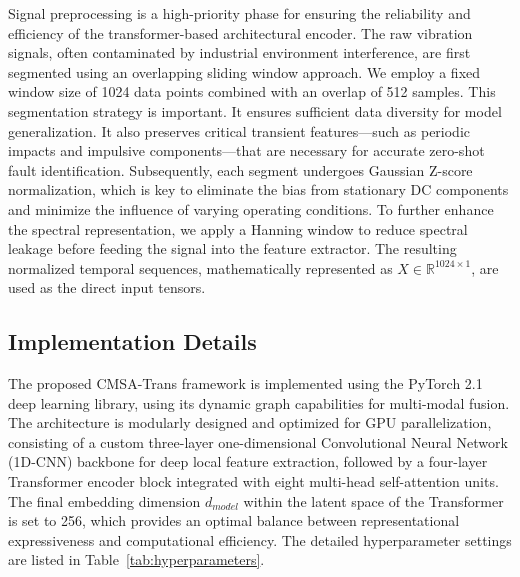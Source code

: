 \documentclass[journal]{IEEEtran}
\begin{document}
Signal preprocessing is a high-priority phase for ensuring the reliability and efficiency of the transformer-based architectural encoder. The raw vibration signals, often contaminated by industrial environment interference, are first segmented using an overlapping sliding window approach. We employ a fixed window size of 1024 data points combined with an overlap of 512 samples. This segmentation strategy is important. It ensures sufficient data diversity for model generalization. It also preserves critical transient features---such as periodic impacts and impulsive components---that are necessary for accurate zero-shot fault identification. Subsequently, each segment undergoes Gaussian Z-score normalization, which is key to eliminate the bias from stationary DC components and minimize the influence of varying operating conditions. To further enhance the spectral representation, we apply a Hanning window to reduce spectral leakage before feeding the signal into the feature extractor. The resulting normalized temporal sequences, mathematically represented as $X \in \mathbb{R}^{1024 \times 1}$, are used as the direct input tensors.

\subsection{Implementation Details}

The proposed CMSA-Trans framework is implemented using the PyTorch 2.1 deep learning library, using its dynamic graph capabilities for multi-modal fusion. The architecture is modularly designed and optimized for GPU parallelization, consisting of a custom three-layer one-dimensional Convolutional Neural Network (1D-CNN) backbone for deep local feature extraction, followed by a four-layer Transformer encoder block integrated with eight multi-head self-attention units. The final embedding dimension $d_{model}$ within the latent space of the Transformer is set to 256, which provides an optimal balance between representational expressiveness and computational efficiency. The detailed hyperparameter settings are listed in Table~\ref{tab:hyperparameters}.


\end{document}

